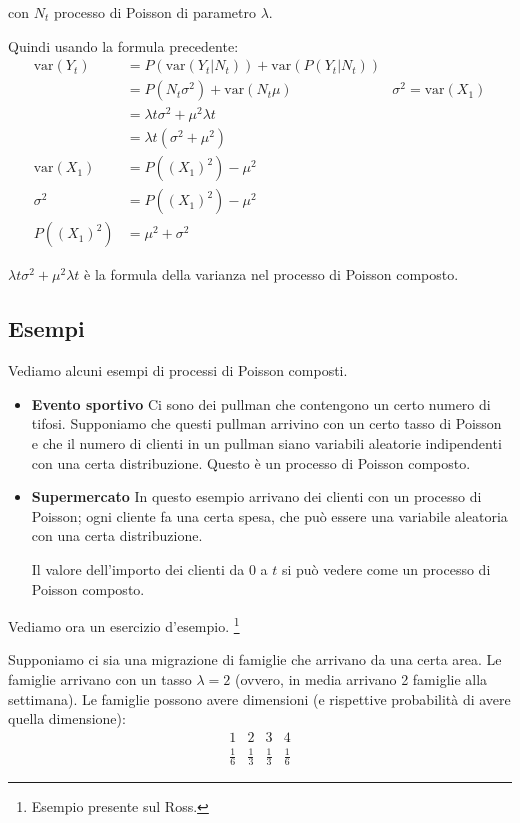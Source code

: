 \documentclass[a4paper,12pt]{book}
\begin{document}
con $ N_t $ processo di Poisson di parametro $\lambda$.

Quindi usando la formula precedente:
\begin{align*}
	\text{var}(Y_t) & = P(\text{var}(Y_t | N_t)) + \text{var}(P(Y_t | N_t)) \\
	& = P(N_t \sigma^2) + \text{var}(N_t \mu) & \sigma^2 = \text{var}(X_1) \\
	& = \lambda t \sigma^2 + \mu^2 \lambda t \\ 
	& = \lambda t(\sigma^2 + \mu^2) \\
	\text{var}(X_1)	 & = P((X_1)^2) - \mu^2 \\
	\sigma^2 & = P((X_1)^2) - \mu^2 \\
	P((X_1)^2) & = \mu^2 + \sigma^2
\end{align*}

$\lambda t \sigma^2 + \mu^2 \lambda t$ è la formula della varianza nel processo di Poisson composto. 

\subsection{Esempi}

Vediamo alcuni esempi di processi di Poisson composti. 

\begin{itemize}
	\item \textbf{Evento sportivo } Ci sono dei pullman che contengono un certo numero di tifosi. Supponiamo che questi pullman arrivino con un certo tasso di Poisson e che il numero di clienti in un pullman siano variabili aleatorie indipendenti con una certa distribuzione. Questo è un processo di Poisson composto. 
	
	\item \textbf{Supermercato } In questo esempio arrivano dei clienti con un processo di Poisson; ogni cliente fa una certa spesa, che può essere una variabile aleatoria con una certa distribuzione.
	
	Il valore dell'importo dei clienti da 0 a $ t $ si può vedere come un processo di Poisson composto. 
\end{itemize}

Vediamo ora un esercizio d'esempio. \footnote{Esempio presente sul Ross.}

Supponiamo ci sia una migrazione di famiglie che arrivano da una certa area. Le famiglie arrivano con un tasso $\lambda = 2$ (ovvero, in media arrivano 2 famiglie alla settimana).
Le famiglie possono avere dimensioni (e rispettive probabilità di avere quella dimensione):
$$ 
\begin{array}{cccc}
	1 & 2 & 3 & 4 \\
	\frac{1}{6} & \frac{1}{3} & \frac{1}{3} & \frac{1}{6}
\end{array}
$$
\end{document}
